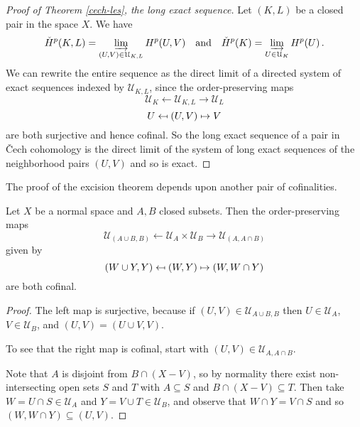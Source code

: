 \begin{proof}[Proof of Theorem \ref{cech-les}, the long exact sequence]
Let $(K,L)$ be a closed pair in the space $X$. We have
\[
\check{H}^p(K,L)=\varinjlim_{(U,V)\in\mathcal{U}_{K,L}}H^p(U,V)
\quad\hbox{and}\quad 
\check{H}^p(K)=\varinjlim_{U\in\mathcal{U}_K}H^p(U)\,.
\]
We can rewrite the entire sequence as
the direct limit of a directed system of exact sequences indexed by 
$\mathcal{U}_{K,L}$, since the order-preserving maps 
\[
\mathcal{U}_K \leftarrow \mathcal{U}_{K,L} \rightarrow \mathcal{U}_L 
\]
\[
U \mathrel{\reflectbox{$\mapsto$}} (U,V) \mapsto V
\]
are both surjective and hence cofinal. So the long exact sequence of a pair
in \v{C}ech cohomology is the direct limit of the system of long exact 
sequences of the neighborhood pairs $(U,V)$ and so is exact. 
\end{proof}

The proof of the excision theorem depends upon another pair of 
cofinalities.

\begin{lemma} Let $X$ be a normal space and $A,B$ closed subsets. 
Then the order-preserving maps
\[
\mathcal{U}_{(A\cup B,B)} \leftarrow \mathcal{U}_A\times\mathcal{U}_B 
\rightarrow \mathcal{U}_{(A,A\cap B)}
\]
given by
\[
(W\cup Y,Y)\mathrel{\reflectbox{$\mapsto$}}(W,Y)\mapsto(W,W\cap Y)
\]
are both cofinal.
\label{lem-cofinal} 
\end{lemma}
\begin{proof}
The left map is surjective, because if $(U,V)\in\mathcal{U}_{A\cup B,B}$
then $U\in\mathcal{U}_A$, $V\in\mathcal{U}_B$, and $(U,V)=(U\cup V,V)$. 

To see that the right map is cofinal, start with 
$(U,V)\in\mathcal{U}_{A,A\cap B}$.


\noindent
Note that $A$ is disjoint from $B\cap(X-V)$, so by normality there exist
non-intersecting open sets $S$ and $T$ with $A\subseteq S$ and 
$B\cap(X-V)\subseteq T$. Then take $W=U\cap S\in\mathcal{U}_A$ and 
$Y=V\cup T\in\mathcal{U}_B$, and observe that $W\cap Y=V\cap S$ and so 
$(W,W\cap Y)\subseteq(U,V)$.
\end{proof}

